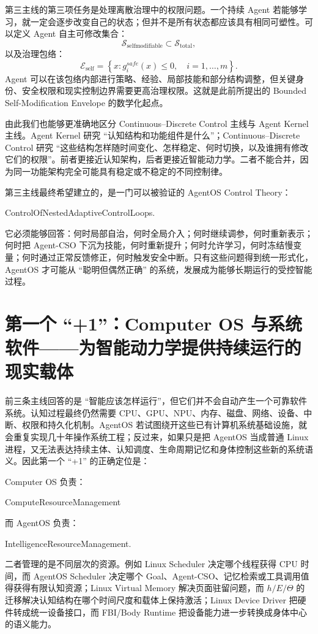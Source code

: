 第三主线的第三项任务是处理离散治理中的权限问题。一个持续 Agent 若能够学习，就一定会逐步改变自己的状态；但并不是所有状态都应该具有相同可塑性。可以定义 Agent 自主可修改集合：
\[
\mathcal S_{\mathrm{selfmodifiable}}
\subset
\mathcal S_{\mathrm{total}},
\]
以及治理包络：
\[
\boxed{
\mathcal E_{\mathrm{self}}
=
\left\{
x:
g_i^{safe}(x)\leq0,
\quad i=1,\ldots,m
\right\}.
}
\]
Agent 可以在该包络内部进行策略、经验、局部技能和部分结构调整，但关键身份、安全权限和现实控制边界需要更高治理权限。这就是此前所提出的 Bounded Self-Modification Envelope 的数学化起点。

由此我们也能够更准确地区分 Continuous--Discrete Control 主线与 Agent Kernel 主线。Agent Kernel 研究 ``认知结构和功能组件是什么''；Continuous--Discrete Control 研究 ``这些结构怎样随时间变化、怎样稳定、何时切换，以及谁拥有修改它们的权限''。前者更接近认知架构，后者更接近智能动力学。二者不能合并，因为同一功能架构完全可能具有稳定或不稳定的不同控制律。

第三主线最终希望建立的，是一门可以被验证的 AgentOS Control Theory：
\begin{statementbox}
ControlOfNestedAdaptiveControlLoops.
\end{statementbox}
它必须能够回答：何时局部自治，何时全局介入；何时继续调参，何时重新表示；何时把 Agent-CSO 下沉为技能，何时重新提升；何时允许学习，何时冻结慢变量；何时通过正常反馈修正，何时触发安全中断。只有这些问题得到统一形式化，AgentOS 才可能从 ``聪明但偶然正确'' 的系统，发展成为能够长期运行的受控智能过程。

\section{第一个 ``+1''：Computer OS 与系统软件——为智能动力学提供持续运行的现实载体}
\label{sec:roadmap-system-software}

前三条主线回答的是 ``智能应该怎样运行''，但它们并不会自动产生一个可靠软件系统。认知过程最终仍然需要 CPU、GPU、NPU、内存、磁盘、网络、设备、中断、权限和持久化机制。AgentOS 若试图绕开这些已有计算机系统基础设施，就会重复实现几十年操作系统工程；反过来，如果只是把 AgentOS 当成普通 Linux 进程，又无法表达持续主体、认知调度、生命周期记忆和身体控制这些新的系统语义。因此第一个 ``+1'' 的正确定位是：
\begin{statementbox}
\centering
{}
\end{statementbox}

Computer OS 负责：
\begin{statementbox}
ComputeResourceManagement
\end{statementbox}
而 AgentOS 负责：
\begin{statementbox}
IntelligenceResourceManagement.
\end{statementbox}
二者管理的是不同层次的资源。例如 Linux Scheduler 决定哪个线程获得 CPU 时间，而 AgentOS Scheduler 决定哪个 Goal、Agent-CSO、记忆检索或工具调用值得获得有限认知资源；Linux Virtual Memory 解决页面驻留问题，而 $h/E/\Theta$ 的迁移解决认知结构在哪个时间尺度和载体上保持激活；Linux Device Driver 把硬件转成统一设备接口，而 FBI/Body Runtime 把设备能力进一步转换成身体中心的语义能力。

